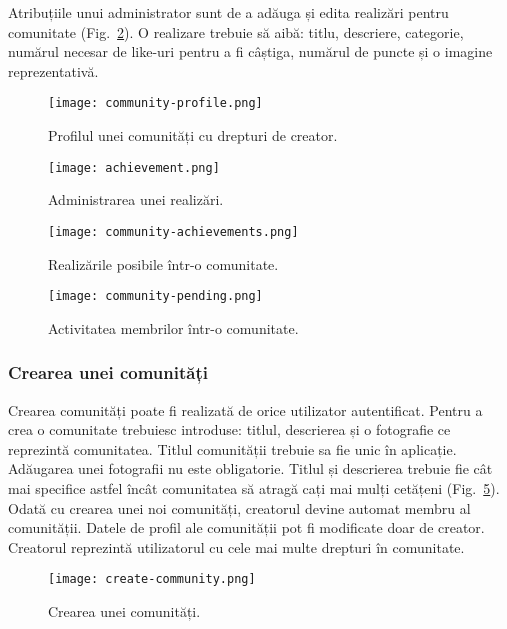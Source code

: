     Atribuțiile unui administrator sunt de a adăuga și edita realizări pentru comunitate (Fig.~\ref{fig:achievement}).
    O realizare trebuie să aibă: titlu, descriere, categorie, numărul necesar de like-uri pentru a fi câștiga,
    numărul de puncte și o imagine reprezentativă. 
    \begin{figure}[h]
    \texttt{[image: community-profile.png]}
    \centering
    \caption{Profilul unei comunități cu drepturi de creator.}
    \label{fig:community-profile}
    \end{figure}   
    \begin{figure}[h]
    \texttt{[image: achievement.png]}
    \centering
    \caption{Administrarea unei realizări.}
    \label{fig:achievement}
    \end{figure}  
    \begin{figure}[h]
    \texttt{[image: community-achievements.png]}
    \centering
    \caption{Realizările posibile într-o comunitate.}
    \label{fig:community-achievements}
    \end{figure}
    \begin{figure}[h]
    \texttt{[image: community-pending.png]}
    \centering
    \caption{Activitatea membrilor într-o comunitate.}
    \label{fig:community-pending}
    \end{figure}   
    \clearpage
    \subsubsection{Crearea unei comunități}
    Crearea comunități poate fi realizată de orice utilizator autentificat. Pentru a crea o comunitate 
    trebuiesc introduse: titlul, descrierea și o fotografie ce reprezintă comunitatea. 
    Titlul comunității trebuie sa fie unic în aplicație. Adăugarea unei fotografii nu este obligatorie.
    Titlul și descrierea trebuie fie cât mai specifice astfel încât comunitatea să atragă cați mai mulți 
    cetățeni (Fig.~\ref{fig:create-community}).
    Odată cu crearea unei noi comunități, creatorul devine automat membru al comunității.
    Datele de profil ale comunității pot fi modificate doar de creator. Creatorul reprezintă utilizatorul 
    cu cele mai multe drepturi în comunitate.
    \begin{figure}[h]
    \texttt{[image: create-community.png]}
    \centering
    \caption{Crearea unei comunități.}
    \label{fig:create-community}
    \end{figure}        
